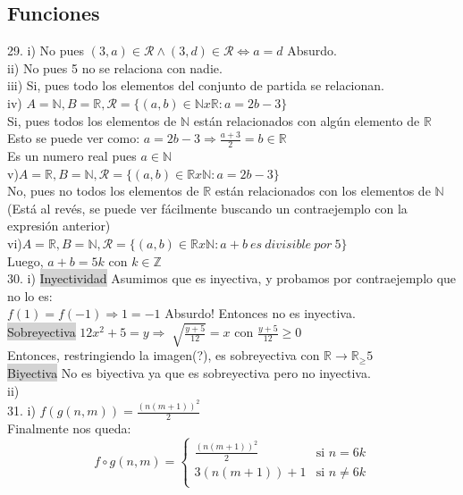 \documentclass[a4paper,11pt]{article}
\begin{document}
\subsection{Funciones}
29. i) No pues \( (3,a) \in \mathcal{R} \land (3,d) \in \mathcal{R} \Leftrightarrow a=d \) Absurdo.\\
ii) No pues 5 no se relaciona con nadie.\\
iii) Si, pues todo los elementos del conjunto de partida se relacionan. \\
iv) \(A=\mathbb{N}, B=\mathbb{R}, \mathcal{R}=\{(a,b) \in \mathbb{N}x\mathbb{R} : a=2b-3\}\)\\
Si, pues todos los elementos de \(\mathbb{N}\) están relacionados con algún elemento de \(\mathbb{R}\) \\
Esto se puede ver como: \(a=2b-3 \Rightarrow \frac{a+3}{2} = b \in \mathbb{R}\)\\
Es un numero real pues \(a\in\mathbb{N}\)\\
v)\(A=\mathbb{R}, B=\mathbb{N}, \mathcal{R}=\{(a,b) \in \mathbb{R}x\mathbb{N} : a=2b-3\}\)\\
No, pues no todos los elementos de \(\mathbb{R}\) están relacionados con los elementos de \(\mathbb{N}\) (Está al revés, se puede ver fácilmente buscando un contraejemplo con la expresión anterior)\\
vi)\(A=\mathbb{R}, B=\mathbb{N}, \mathcal{R}=\{(a,b) \in \mathbb{R}x\mathbb{N} : a+b \:es\:divisible\:por\:5\}\)\\
Luego, \(a+b=5k\) con \(k\in\mathbb{Z}\)\\
30. i) \colorbox{lightgray}{Inyectividad} Asumimos que es inyectiva, y probamos por contraejemplo que no lo es:\\
$f(1)=f(-1) \Rightarrow 1 = -1 $ Absurdo! Entonces no es inyectiva.\\
\colorbox{lightgray}{Sobreyectiva} \(12x^2 + 5 = y \Rightarrow \sqrt[]{\frac{y+5}{12}} = x\) con $\frac{y+5}{12} \geqslant 0$\\
Entonces, restringiendo la imagen(?), es sobreyectiva con $ \mathbb{R} \rightarrow \mathbb{R_\geqslant} 5$ \\ 
\colorbox{lightgray}{Biyectiva} No es biyectiva ya que es sobreyectiva pero no inyectiva. \\
ii)\\
31. i) $f(g(n,m))=\frac{(n(m+1))^2}{2}$\\
Finalmente nos queda:\\
\[
  f\circ g(n,m) =
  \begin{cases}
                                   \frac{(n(m+1))^2}{2} & \text{si $n=6k$} \\
                                   3(n(m+1))+1 & \text{si $n \neq 6k$} \\
  \end{cases}
%
\]
\end{document}
